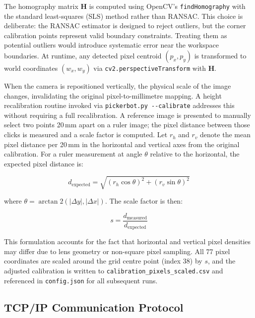 \documentclass{MIPRO}
\begin{document}
The homography matrix $\mathbf{H}$ is computed using OpenCV's \texttt{findHomography} with the standard least-squares (SLS) method rather than RANSAC. This choice is deliberate: the RANSAC estimator is designed to reject outliers, but the corner calibration points represent valid boundary constraints. Treating them as potential outliers would introduce systematic error near the workspace boundaries. At runtime, any detected pixel centroid $(p_x, p_y)$ is transformed to world coordinates $(w_x, w_y)$ via \texttt{cv2.perspectiveTransform} with $\mathbf{H}$.

When the camera is repositioned vertically, the physical scale of the image changes, invalidating the original pixel-to-millimetre mapping. A height recalibration routine invoked via \texttt{pickerbot.py -{}-calibrate} addresses this without requiring a full recalibration. A reference image is presented to manually select two points 20\,mm apart on a ruler image; the pixel distance between those clicks is measured and a scale factor is computed. Let $r_h$ and $r_v$ denote the mean pixel distance per 20\,mm in the horizontal and vertical axes from the original calibration. For a ruler measurement at angle $\theta$ relative to the horizontal, the expected pixel distance is:

\begin{equation}
  d_{\mathrm{expected}} = \sqrt{\left(r_h \cos\theta\right)^2 + \left(r_v \sin\theta\right)^2}
  \label{eq:expected_dist}
\end{equation}

where $\theta = \arctan2(|\Delta y|, |\Delta x|)$. The scale factor is then:

\begin{equation}
  s = \frac{d_{\mathrm{measured}}}{d_{\mathrm{expected}}}
  \label{eq:scale_factor}
\end{equation}

This formulation accounts for the fact that horizontal and vertical pixel densities may differ due to lens geometry or non-square pixel sampling. All 77 pixel coordinates are scaled around the grid centre point (index 38) by $s$, and the adjusted calibration is written to \texttt{calibration\_pixels\_scaled.csv} and referenced in \texttt{config.json} for all subsequent runs.

\subsection{TCP/IP Communication Protocol}
\end{document}
